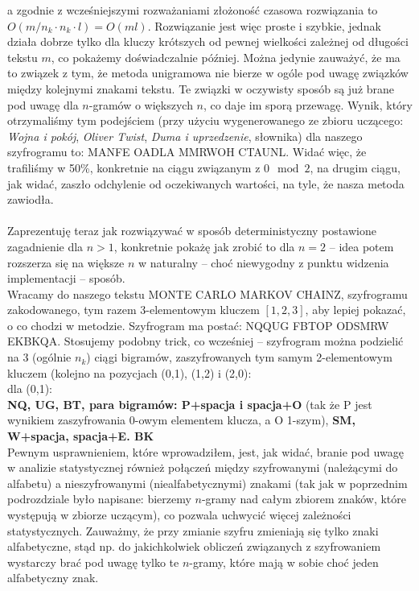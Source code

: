 \documentclass[a4paper]{article}
\theoremstyle{defn}
\theoremstyle{theorem}
\theoremstyle{lemma}
\theoremstyle{cor}
\theoremstyle{fact}
\begin{document}
a zgodnie z wcześniejszymi rozważaniami złożoność czasowa rozwiązania to $O(m/n_k \cdot n_k \cdot l) = O(ml)$. Rozwiązanie jest więc proste i szybkie, jednak działa dobrze tylko dla kluczy krótszych od pewnej wielkości zależnej od długości tekstu $m$, co pokażemy doświadczalnie później. Można jedynie zauważyć, że ma to związek z tym, że metoda unigramowa nie bierze w ogóle pod uwagę związków między kolejnymi znakami tekstu. Te związki w oczywisty sposób są już brane pod uwagę dla $n$-gramów o większych $n$, co daje im sporą przewagę. Wynik, który otrzymaliśmy tym podejściem (przy użyciu wygenerowanego ze zbioru uczącego: \textit{Wojna i pokój}, \textit{Oliver Twist}, \textit{Duma i uprzedzenie}, słownika) dla naszego szyfrogramu to: MANFE OADLA MMRWOH CTAUNL. Widać więc, że trafiliśmy w 50\%, konkretnie na ciągu związanym z $0 \mod 2$, na drugim ciągu, jak widać, zaszło odchylenie od oczekiwanych wartości, na tyle, że nasza metoda zawiodła.\\\\
Zaprezentuję teraz jak rozwiązywać w sposób deterministyczny postawione zagadnienie dla $n > 1$, konkretnie pokażę jak zrobić to dla $n=2$ – idea potem rozszerza się na większe $n$ w naturalny – choć niewygodny z punktu widzenia implementacji – sposób.\\
Wracamy do naszego tekstu MONTE CARLO MARKOV CHAINZ, szyfrogramu zakodowanego, tym razem 3-elementowym kluczem $[1,2,3]$, aby lepiej pokazać, o co chodzi w metodzie. Szyfrogram ma postać: NQQUG FBTOP ODSMRW EKBKQA. Stosujemy podobny trick, co wcześniej – szyfrogram można podzielić na 3 (ogólnie $n_k$) ciągi bigramów, zaszyfrowanych tym samym 2-elementowym kluczem (kolejno na pozycjach (0,1), (1,2) i (2,0):\\
dla (0,1):\\
\textbf{NQ, UG, BT, para bigramów: P+spacja i spacja+O} (tak że P jest wynikiem zaszyfrowania 0-owym elementem klucza, a O 1-szym), \textbf{SM, W+spacja, spacja+E. BK}\\
Pewnym usprawnieniem, które wprowadziłem, jest, jak widać, branie pod uwagę w analizie statystycznej również połączeń między szyfrowanymi (należącymi do alfabetu) a nieszyfrowanymi (niealfabetycznymi) znakami (tak jak w poprzednim podrozdziale było napisane: bierzemy $n$-gramy nad całym zbiorem znaków, które występują w zbiorze uczącym), co pozwala uchwycić więcej zależności statystycznych. Zauważmy, że przy zmianie szyfru zmieniają się tylko znaki alfabetyczne, stąd np. do jakichkolwiek obliczeń związanych z szyfrowaniem wystarczy brać pod uwagę tylko te $n$-gramy, które mają w sobie choć jeden alfabetyczny znak.
\end{document}
